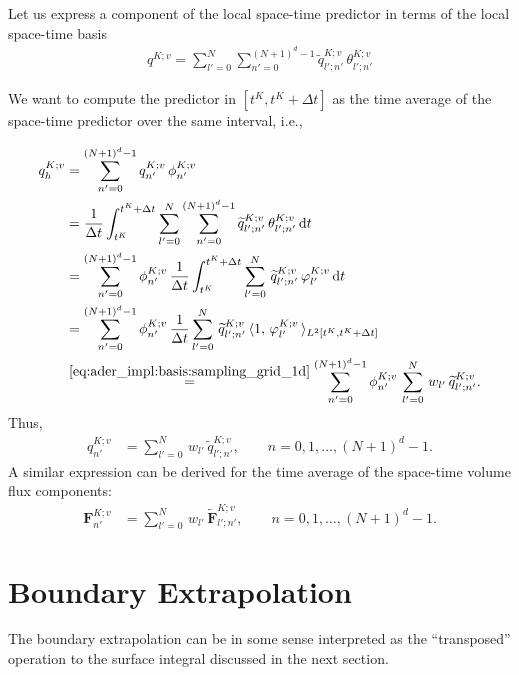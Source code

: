 \documentclass{scrreprt}
\theoremstyle{definition}
\theoremstyle{nonumberplain}
\newcommand{\cell}{K}
\newcommand{\dt}{\textup{d}t}
\begin{document}
Let us express a component of the local space-time predictor in terms
of the local space-time basis
\begin{align*}
q^{\cell;v}
=
\sum_{l'=0}^{N}
\sum_{n'=0}^{(N+1)^{d}-1}
\widetilde{q}^{\cell;v}_{l';n'}\,
\theta^{\cell;v}_{l';n'}
\end{align*}

We want to compute the predictor in $[t^\cell,t^\cell+\Delta t]$
as the time average of the space-time predictor over the same interval, i.e.,

\begin{align*}
q^{\cell;v}_h
&=
\sum_{n'=0}^{(N+1)^{d}-1}
q^{\cell;v}_{n'}\,
\phi^{\cell;v}_{n'}\,
\\
&=
\frac{1}{\Delta t}
\int_{t^\cell}^{t^\cell+\Delta t}
\sum_{l'=0}^{N}
\sum_{n'=0}^{(N+1)^{d}-1}
\widetilde{q}^{\cell;v}_{l';n'}\,
\theta^{\cell;v}_{l';n'}\,
\dt
\\
&=
\sum_{n'=0}^{(N+1)^{d}-1}
\phi^{\cell;v}_{n'}\,
\frac{1}{\Delta t}
\int_{t^\cell}^{t^\cell+\Delta t}
\sum_{l'=0}^{N}\,
\widetilde{q}^{\cell;v}_{l';n'}\,
\varphi^{\cell;v}_{l'}\,
\dt
\\
&=
\sum_{n'=0}^{(N+1)^{d}-1}
\phi^{\cell;v}_{n'}\,
\frac{1}{\Delta t}
\sum_{l'=0}^{N}\,
\widetilde{q}^{\cell;v}_{l';n'}\,
\langle
1,\,
\varphi^{\cell;v}_{l'}\,
\rangle_{L^2[t^\cell,t^\cell+\Delta t]}
\\
&\overset{\eqref{eq:ader_impl:basis:sampling_grid_1d}}
{=}
\sum_{n'=0}^{(N+1)^{d}-1}
\phi^{\cell;v}_{n'}\,
\sum_{l'=0}^{N}\,
w_{l'}\,
\widetilde{q}^{\cell;v}_{l';n'}.
\end{align*}
Thus,
\begin{align}
q^{\cell;v}_{n'}
&=\sum_{l'=0}^{N}\,
w_{l'}\,
\widetilde{q}^{\cell;v}_{l';n'},\qquad n=0,1,\ldots,(N+1)^d-1.
\end{align}
A similar expression can be derived for the time average of
the space-time volume flux components:
\begin{align}
\textbf{F}^{\cell;v}_{n'}
&=\sum_{l'=0}^{N}\,
w_{l'}\,
\widetilde{\textbf{F}}^{\cell;v}_{l';n'},\qquad n=0,1,\ldots,(N+1)^d-1.
\end{align}
\section{Boundary Extrapolation}
The boundary extrapolation can be in some sense
interpreted as the ``transposed'' operation to
the surface integral discussed in the next section.
\end{document}
